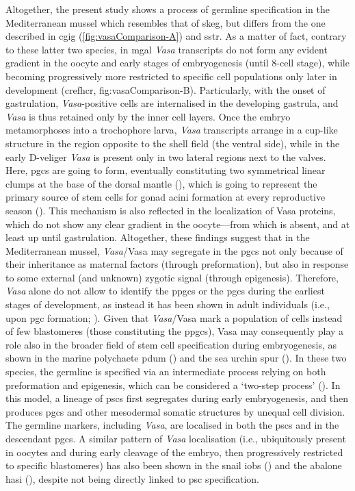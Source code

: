 Altogether, the present study shows a process of germline specification in the Mediterranean mussel which resembles that of \gls{skeg}, but differs from the one described in \gls{cgig} (\cref{fig:vasaComparison-A}) and \gls{sstr}. As a matter of fact, contrary to these latter two species, in \gls{mgal} \textit{Vasa} transcripts do not form any evident gradient in the oocyte and early stages of embryogenesis (until 8-cell stage), while becoming progressively more restricted to specific cell populations only later in development (cref{hcr, fig:vasaComparison-B}). Particularly, with the onset of gastrulation, \textit{Vasa}-positive cells are internalised in the developing gastrula, and \textit{Vasa} is thus retained only by the inner cell layers. Once the embryo metamorphoses into a trochophore larva, \textit{Vasa} transcripts arrange in a cup-like structure in the region opposite to the shell field (the ventral side), while in the early D-veliger \textit{Vasa} is present only in two lateral regions next to the valves. Here, \glspl{pgc} are going to form, eventually constituting two symmetrical linear clumps at the base of the dorsal mantle (), which is going to represent the primary source of stem cells for gonad acini formation at every reproductive season (). This mechanism is also reflected in the localization of Vasa proteins, which do not show any clear gradient in the oocyte---from which is absent, and at least up until gastrulation. Altogether, these findings suggest that in the Mediterranean mussel, \textit{Vasa}/Vasa may segregate in the \glspl{pgc} not only because of their inheritance as maternal factors (through preformation), but also in response to some external (and unknown) zygotic signal (through epigenesis). Therefore, \textit{Vasa} alone do not allow to identify the \glspl{ppgc} or the \glspl{pgc} during the earliest stages of development, as instead it has been shown in adult individuals (i.e., upon \gls{pgc} formation; ). Given that \textit{Vasa}/Vasa mark a population of cells instead of few blastomeres (those constituting the \glspl{ppgc}), Vasa may consequently play a role also in the broader field of stem cell specification during embryogenesis, as shown in the marine polychaete \gls{pdum} () and the sea urchin \gls{spur} (). In these two species, the germline is specified via an intermediate process relying on both preformation and epigenesis, which can be considered a ‘two-step process’ (). In this model, a lineage of \glspl{psc} first segregates during early embryogenesis, and then produces \glspl{pgc} and other mesodermal somatic structures by unequal cell division. The germline markers, including \textit{Vasa}, are localised in both the \glspl{psc} and in the descendant \glspl{pgc}. A similar pattern of \textit{Vasa} localisation (i.e., ubiquitously present in oocytes and during early cleavage of the embryo, then progressively restricted to specific blastomeres) has also been shown in the snail \gls{iobs} () and the abalone \gls{hasi} (), despite not being directly linked to \gls{psc} specification.


